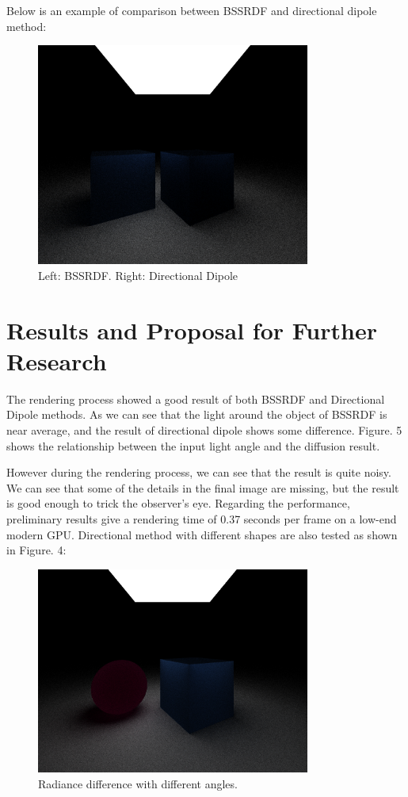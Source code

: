 \documentclass[11pt]{article}
\begin{document}
Below is an example of comparison between BSSRDF and directional dipole method:

\begin{figure}[htb]
\centering
\includegraphics[width=9cm]{./img/comparison.png}
\caption{\label{fig:orgparagraph2}
Left: BSSRDF. Right: Directional Dipole}
\end{figure}


\section{Results and Proposal for Further Research}
\label{sec:orgheadline8}


The rendering process showed a good result of both BSSRDF and Directional Dipole methods. 
As we can see that the light around the object of BSSRDF is near average, and 
the result of directional dipole shows some difference. Figure. 5
shows the relationship between the input light angle and the diffusion
result. 

However during the rendering process, we can see that the
 result is quite noisy.
 We can see that some of the details in the final image are missing, 
but the result is good enough to trick the observer's eye. Regarding the performance, 
preliminary results give a rendering time of 0.37 seconds per frame on
a low-end modern GPU. Directional method with different shapes are
also tested as shown in Figure. 4: 
\begin{figure}[htb]
\centering
\includegraphics[width=9cm]{./img/ball and cube.png}
\caption{\label{fig:orgparagraph4}
Radiance difference with different angles.}
\end{figure}
\end{document}
